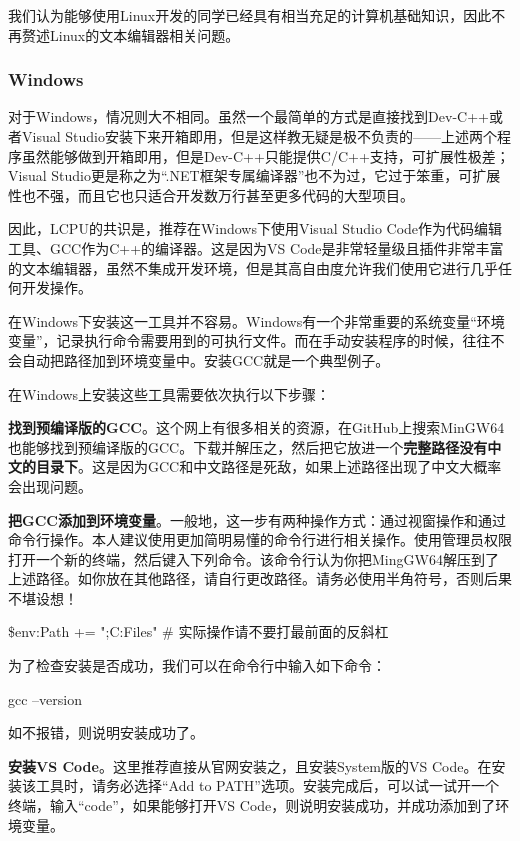 \documentclass[12pt]{report}
\begin{document}
我们认为能够使用Linux开发的同学已经具有相当充足的计算机基础知识，因此不再赘述Linux的文本编辑器相关问题。

\subsubsection{Windows}

对于Windows，情况则大不相同。虽然一个最简单的方式是直接找到Dev-C++或者Visual Studio安装下来开箱即用，但是这样教无疑是极不负责的——上述两个程序虽然能够做到开箱即用，但是Dev-C++只能提供C/C++支持，可扩展性极差；Visual Studio更是称之为“.NET框架专属编译器”也不为过，它过于笨重，可扩展性也不强，而且它也只适合开发数万行甚至更多代码的大型项目。

因此，LCPU的共识是，推荐在Windows下使用Visual Studio Code作为代码编辑工具、GCC作为C++的编译器。这是因为VS Code是非常轻量级且插件非常丰富的文本编辑器，虽然不集成开发环境，但是其高自由度允许我们使用它进行几乎任何开发操作。

在Windows下安装这一工具并不容易。Windows有一个非常重要的系统变量“环境变量”，记录执行命令需要用到的可执行文件。而在手动安装程序的时候，往往不会自动把路径加到环境变量中。安装GCC就是一个典型例子。

在Windows上安装这些工具需要依次执行以下步骤：

\textbf{找到预编译版的GCC}。这个网上有很多相关的资源，在GitHub上搜索MinGW64也能够找到预编译版的GCC。下载并解压之，然后把它放进一个\textbf{完整路径没有中文的目录下}。这是因为GCC和中文路径是死敌，如果上述路径出现了中文大概率会出现问题。

\textbf{把GCC添加到环境变量}。一般地，这一步有两种操作方式：通过视窗操作和通过命令行操作。本人建议使用更加简明易懂的命令行进行相关操作。使用管理员权限打开一个新的终端，然后键入下列命令。该命令行认为你把MingGW64解压到了上述路径。如你放在其他路径，请自行更改路径。请务必使用半角符号，否则后果不堪设想！

\begin{codebox}[title=把GCC添加到环境变量]
    \$env:Path += ";C:\Program Files\bin" # 实际操作请不要打最前面的反斜杠
\end{codebox}

为了检查安装是否成功，我们可以在命令行中输入如下命令：
\begin{codebox}
    gcc --version
\end{codebox}

如不报错，则说明安装成功了。

\textbf{安装VS Code}。这里推荐直接从官网安装之，且安装System版的VS Code。在安装该工具时，请务必选择“Add to PATH”选项。安装完成后，可以试一试开一个终端，输入“code”，如果能够打开VS Code，则说明安装成功，并成功添加到了环境变量。
\end{document}
